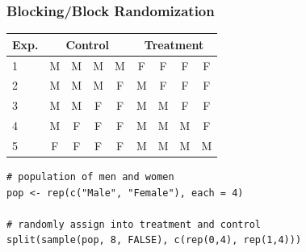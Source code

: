 \documentclass[14pt]{beamer}
\begin{document}
\subsubsection{Blocking/Block Randomization}



\begin{frame}[fragile]

\begin{center}
\begin{tabular}{lcccccccc}
Exp. & \multicolumn{4}{c}{Control} & \multicolumn{4}{c}{Treatment} \\ \midrule
1 & M & M & M & M & F & F & F & F \\
2 & M & M & M & F & M & F & F & F \\
3 & M & M & F & F & M & M & F & F \\
4 & M & F & F & F & M & M & M & F \\
5 & F & F & F & F & M & M & M & M \\ \bottomrule
\end{tabular}
\end{center}


{\scriptsize
\begin{verbatim}
# population of men and women
pop <- rep(c("Male", "Female"), each = 4)

# randomly assign into treatment and control
split(sample(pop, 8, FALSE), c(rep(0,4), rep(1,4)))
\end{verbatim}
}

\end{frame}
\end{document}
